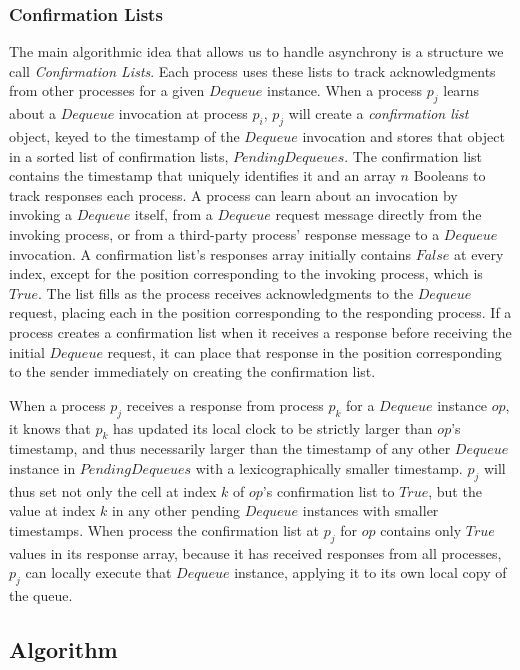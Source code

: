 \documentclass[a4paper,anonymous,USenglish]{lipics-v2021}
\theoremstyle{definition}
\begin{document}
\subsubsection{Confirmation Lists}\label{sec:confLists}
The main algorithmic idea that allows us to handle asynchrony is a structure we call \emph{Confirmation Lists}.  Each process uses these lists to track acknowledgments from other processes for a given $Dequeue$ instance.  When a process $p_j$ learns about a $Dequeue$ invocation at process $p_i$, $p_j$ will create a \emph{confirmation list} object, keyed to the timestamp of the $Dequeue$ invocation and stores that object in a sorted list of confirmation lists, $PendingDequeues$.  The confirmation list contains the timestamp that uniquely identifies it and an array $n$ Booleans to track responses each process.  A process can learn about an invocation by invoking a $Dequeue$ itself, from a $Dequeue$ request message directly from the invoking process, or from a third-party process' response message to a $Dequeue$ invocation.  A confirmation list's responses array initially contains $False$ at every index, except for the position corresponding to the invoking process, which is $True$.  The list fills as the process receives acknowledgments to the $Dequeue$ request, placing each in the position corresponding to the responding process.  If a process creates a confirmation list when it receives a response before receiving the initial $Dequeue$ request, it can place that response in the position corresponding to the sender immediately on creating the confirmation list.

When a process $p_j$ receives a response from process $p_k$ for a $Dequeue$ instance $op$, it knows that $p_k$ has updated its local clock to be strictly larger than $op$'s timestamp, and thus necessarily larger than the timestamp of any other $Dequeue$ instance in $PendingDequeues$ with a lexicographically smaller timestamp.  $p_j$ will thus set not only the cell at index $k$ of $op$'s confirmation list to $True$, but the value at index $k$ in any other pending $Dequeue$ instances with smaller timestamps.  When process the confirmation list at $p_j$ for $op$ contains only $True$ values in its response array, because it has received responses from all processes, $p_j$ can locally execute that $Dequeue$ instance, applying it to its own local copy of the queue.  

\subsection{Algorithm}
\end{document}
